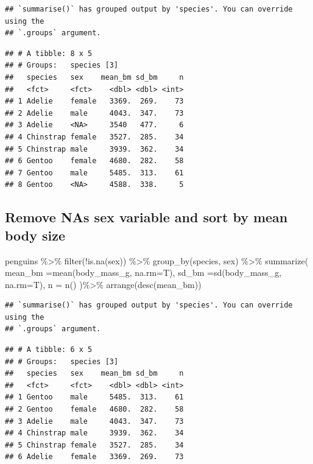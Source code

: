 \documentclass[
]{book}
\newenvironment{Shaded}{\begin{snugshade}}{\end{snugshade}}
\newcommand{\AttributeTok}[1]{\textcolor[rgb]{0.77,0.63,0.00}{#1}}
\newcommand{\FunctionTok}[1]{\textcolor[rgb]{0.00,0.00,0.00}{#1}}
\newcommand{\NormalTok}[1]{#1}
\newcommand{\SpecialCharTok}[1]{\textcolor[rgb]{0.00,0.00,0.00}{#1}}
\begin{document}
\begin{verbatim}
## `summarise()` has grouped output by 'species'. You can override using the
## `.groups` argument.
\end{verbatim}

\begin{verbatim}
## # A tibble: 8 x 5
## # Groups:   species [3]
##   species   sex    mean_bm sd_bm     n
##   <fct>     <fct>    <dbl> <dbl> <int>
## 1 Adelie    female   3369.  269.    73
## 2 Adelie    male     4043.  347.    73
## 3 Adelie    <NA>     3540   477.     6
## 4 Chinstrap female   3527.  285.    34
## 5 Chinstrap male     3939.  362.    34
## 6 Gentoo    female   4680.  282.    58
## 7 Gentoo    male     5485.  313.    61
## 8 Gentoo    <NA>     4588.  338.     5
\end{verbatim}

\hypertarget{remove-nas-sex-variable-and-sort-by-mean-body-size}{%
\subsection{Remove NAs sex variable and sort by mean body
size}\label{remove-nas-sex-variable-and-sort-by-mean-body-size}}

\begin{Shaded}
\begin{Highlighting}[]
\NormalTok{penguins }\SpecialCharTok{\%\textgreater{}\%} 
  \FunctionTok{filter}\NormalTok{(}\SpecialCharTok{!}\FunctionTok{is.na}\NormalTok{(sex)) }\SpecialCharTok{\%\textgreater{}\%} 
  \FunctionTok{group\_by}\NormalTok{(species, sex) }\SpecialCharTok{\%\textgreater{}\%}
  \FunctionTok{summarize}\NormalTok{(}
    \AttributeTok{mean\_bm =}\FunctionTok{mean}\NormalTok{(body\_mass\_g, }\AttributeTok{na.rm=}\NormalTok{T),}
    \AttributeTok{sd\_bm   =}\FunctionTok{sd}\NormalTok{(body\_mass\_g, }\AttributeTok{na.rm=}\NormalTok{T),}
    \AttributeTok{n            =} \FunctionTok{n}\NormalTok{()}
\NormalTok{)}\SpecialCharTok{\%\textgreater{}\%} 
\FunctionTok{arrange}\NormalTok{(}\FunctionTok{desc}\NormalTok{(mean\_bm))}
\end{Highlighting}
\end{Shaded}

\begin{verbatim}
## `summarise()` has grouped output by 'species'. You can override using the
## `.groups` argument.
\end{verbatim}

\begin{verbatim}
## # A tibble: 6 x 5
## # Groups:   species [3]
##   species   sex    mean_bm sd_bm     n
##   <fct>     <fct>    <dbl> <dbl> <int>
## 1 Gentoo    male     5485.  313.    61
## 2 Gentoo    female   4680.  282.    58
## 3 Adelie    male     4043.  347.    73
## 4 Chinstrap male     3939.  362.    34
## 5 Chinstrap female   3527.  285.    34
## 6 Adelie    female   3369.  269.    73
\end{verbatim}
\end{document}
